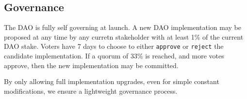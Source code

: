 \documentclass[a4paper, 12pt]{article}
\begin{document}
	\subsection{Governance}
	The DAO is fully self governing at launch. A new DAO implementation may be proposed at any time by any curretn stakeholder with at least 1\% of the current DAO stake.
	Voters have 7 days to choose to either \texttt{approve} or \texttt{reject} the candidate implementation. If a quorum of 33\% is reached, and more votes approve, then the new implementation may 			be committed.

	By only allowing full implementation upgrades, even for simple constant modifications, we ensure a lightweight governance process.
\end{document}
